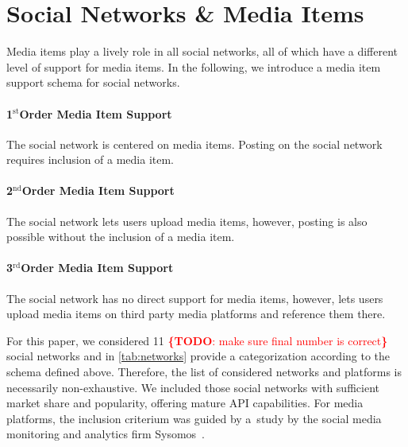 \documentclass{acm_proc_article-sp}
\newcommand{\todo}[1]{\noindent\textcolor{red}{{\bf \{TODO}: #1{\bf \}}}}
\newcommand{\superscript}[1]{\ensuremath{^{\textrm{#1}}}}
\newcommand{\st}[0]{\superscript{st}}
\newcommand{\nd}[0]{\superscript{nd}}
\newcommand{\rd}[0]{\superscript{rd}}
\begin{document}
\section{Social Networks \& Media Items}
Media items play a lively role in all social networks,
all of which have a different level of support for media items.
In the following, we introduce a media item support schema for social networks.

\paragraph{1\st Order Media Item Support}
The social network is centered on media items.
Posting on the social network requires inclusion of a media item.

\paragraph{2\nd Order Media Item Support}
The social network lets users upload media items, however,
posting is also possible without the inclusion of a media item.

\paragraph{3\rd Order Media Item Support}
The social network has no direct support for media items, however,
lets users upload media items on third party media platforms and reference them there.

For this paper, we considered 11 \todo{make sure final number is correct} social networks and in \autoref{tab:networks} provide a categorization according to the schema defined above.
Therefore, the list of considered networks and platforms is necessarily non-exhaustive.
We included those social networks with sufficient market share and popularity, offering mature API capabilities.
For media platforms, the inclusion criterium was guided by a~study by the social media monitoring and analytics firm Sysomos~\cite{Sysomos2011}.
\end{document}
